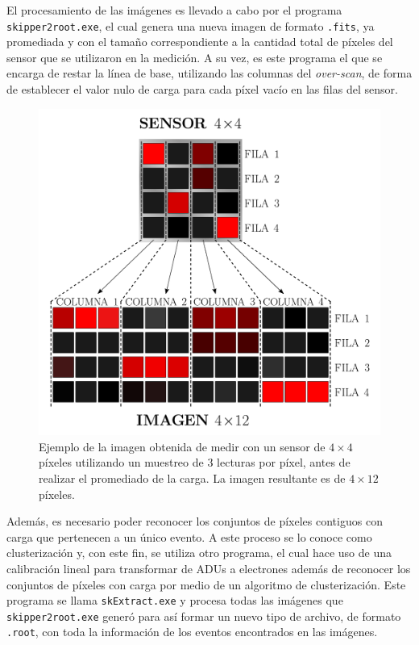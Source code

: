 El procesamiento de las imágenes es llevado a cabo por el programa \verb|skipper2root.exe|, el cual genera una nueva imagen de formato \verb|.fits|, ya promediada y con el tamaño correspondiente a la cantidad total de píxeles del sensor que se utilizaron en la medición. 
A su vez, es este programa el que se encarga de restar la línea de base, utilizando las columnas del \textit{over-scan}, de forma de establecer el valor nulo de carga para cada píxel vacío en las filas del sensor.
\begin{figure}[h]
    \centering
    \includegraphics[scale=0.4]{Figs/skipper2root_scheme.pdf}
    \caption{Ejemplo de la imagen obtenida de medir con un sensor de $4\times4$ píxeles utilizando un muestreo de $3$ lecturas por píxel, antes de realizar el promediado de la carga. La imagen resultante es de $4\times 12$ píxeles.}
    \label{fig:Skipper2root_esquema}
\end{figure}

Además, es necesario poder reconocer los conjuntos de píxeles contiguos con carga que pertenecen a un único evento. A este proceso se lo conoce como clusterización y, con este fin, se utiliza otro programa, el cual hace uso de una calibración lineal para transformar de ADUs a electrones además de reconocer los conjuntos de píxeles con carga por medio de un algoritmo de clusterización. Este programa se llama \verb|skExtract.exe| y procesa todas las imágenes que \verb|skipper2root.exe| generó para así formar un nuevo tipo de archivo, de formato \verb|.root|, con toda la información de los eventos encontrados en las imágenes. 

